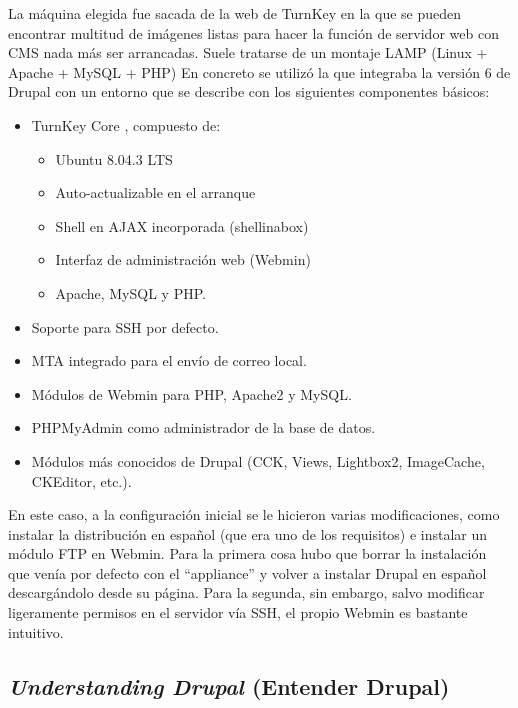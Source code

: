 La máquina elegida fue sacada de la web de TurnKey \cite{references:turnkey} en la que se pueden encontrar multitud de imágenes listas para hacer la función de servidor web con CMS nada más ser arrancadas. Suele tratarse de un montaje LAMP (Linux + Apache + MySQL + PHP) \cite{references:LAMP} En concreto se utilizó la que integraba la versión 6 de Drupal \cite{references:turnkeydrupal} con un entorno que se describe con los siguientes componentes básicos:

\begin{itemize}
\item TurnKey Core \cite{references:turnkeycore}, compuesto de:
	\begin{itemize}
	\item Ubuntu 8.04.3 LTS
	\item Auto-actualizable en el arranque
	\item Shell en AJAX incorporada (shellinabox\cite{references:shellinabox})
	\item Interfaz de administración web (Webmin\cite{references:webmin})
	\item Apache, MySQL y PHP.
	\end{itemize}
\item Soporte para SSH por defecto.
\item MTA integrado para el envío de correo local.
\item Módulos de Webmin para PHP, Apache2 y MySQL.
\item PHPMyAdmin como administrador de la base de datos.
\item Módulos más conocidos de Drupal (CCK, Views, Lightbox2, ImageCache, CKEditor, etc.).
\end{itemize}

\par En este caso, a la configuración inicial se le hicieron varias modificaciones, como instalar la distribución en español (que era uno de los requisitos) e instalar un módulo FTP en Webmin. Para la primera cosa hubo que borrar la instalación que venía por defecto con el ``appliance'' y volver a instalar Drupal en español descargándolo desde su página\cite{references:drupalhispano}. Para la segunda, sin embargo, salvo modificar ligeramente permisos en el servidor vía SSH, el propio Webmin es bastante intuitivo.

\subsection{\textit{Understanding Drupal} (Entender Drupal)}

